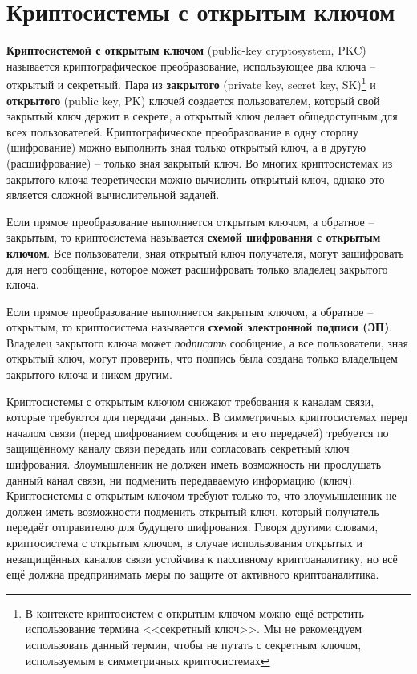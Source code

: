 \chapter{Криптосистемы с открытым ключом}\label{chapter-public-key}

\textbf{Криптосистемой с открытым ключом} (public-key cryptosystem, PKC) называется криптографическое преобразование, использующее два ключа -- открытый и секретный. Пара из \textbf{закрытого} (private key, secret key, SK)\footnote{В контексте криптосистем с открытым ключом можно ещё встретить использование термина <<секретный ключ>>. Мы не рекомендуем использовать данный термин, чтобы не путать с секретным ключом, используемым в симметричных криптосистемах} и \textbf{открытого} (public key, PK) ключей создается пользователем, который свой закрытый ключ держит в секрете, а открытый ключ делает общедоступным для всех пользователей. Криптографическое преобразование в одну сторону (шифрование) можно выполнить зная только открытый ключ, а в другую (расшифрование) -- только зная закрытый ключ. Во многих криптосистемах из закрытого ключа теоретически можно вычислить открытый ключ, однако это является сложной вычислительной задачей.

Если прямое преобразование выполняется открытым ключом, а обратное -- закрытым, то криптосистема называется \textbf{схемой шифрования с открытым ключом}. Все пользователи, зная открытый ключ получателя, могут зашифровать для него сообщение, которое может расшифровать только владелец закрытого ключа.

Если прямое преобразование выполняется закрытым ключом, а обратное -- открытым, то криптосистема называется \textbf{схемой электронной подписи (ЭП)}. Владелец закрытого ключа может \emph{подписать} сообщение, а все пользователи, зная открытый ключ, могут проверить, что подпись была создана только владельцем закрытого ключа и никем другим.

Криптосистемы с открытым ключом снижают требования к каналам связи, которые требуются для передачи данных. В симметричных криптосистемах перед началом связи (перед шифрованием сообщения и его передачей) требуется по защищённому каналу связи передать или согласовать секретный ключ шифрования. Злоумышленник не должен иметь возможность ни прослушать данный канал связи, ни подменить передаваемую информацию (ключ). Криптосистемы с открытым ключом требуют только то, что злоумышленник не должен иметь возможности подменить открытый ключ, который получатель передаёт отправителю для будущего шифрования. Говоря другими словами, криптосистема с открытым ключом, в случае использования открытых и незащищённых каналов связи устойчива к пассивному криптоаналитику, но всё ещё должна предпринимать меры по защите от активного криптоаналитика.

